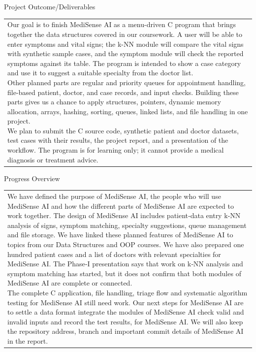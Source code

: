 \documentclass[12pt,a4paper]{article}
\newcommand{\sectiontitle}[1]{%
    {\color{GEUBlue}
    \fontsize{18}{22}\selectfont #1}
}
\newcommand{\answerbox}[2]{%
    \begin{tabularx}{\textwidth}{
        |>{\raggedright\arraybackslash}X|}
        \hline
        \parbox[t][#1][t]{\dimexpr\linewidth-12pt\relax}{
            \vspace{5pt}
            \fontsize{11}{13}\selectfont #2
        }\\
        \hline
    \end{tabularx}
}
\begin{document}
\newpage


\vspace*{0.30cm}

\sectiontitle{Project Outcome/Deliverables }

\vspace{0.05cm}

\vspace{0.35cm}

\answerbox{5.50cm}{Our goal is to finish MediSense AI as a menu-driven C program that brings together the data structures covered in our coursework. A user will be able to enter symptoms and vital signs; the k-NN module will compare the vital signs with synthetic sample cases, and the symptom module will check the reported symptoms against its table. The program is intended to show a case category and use it to suggest a suitable specialty from the doctor list.\\
Other planned parts are regular and priority queues for appointment handling, file-based patient, doctor, and case records, and input checks. Building these parts gives us a chance to apply structures, pointers, dynamic memory allocation, arrays, hashing, sorting, queues, linked lists, and file handling in one project.\\
We plan to submit the C source code, synthetic patient and doctor datasets, test cases with their results, the project report, and a presentation of the workflow. The program is for learning only; it cannot provide a medical diagnosis or treatment advice.}

\vspace{0.75cm}

\sectiontitle{Progress Overview }

\vspace{0.05cm}


\vspace{0.25cm}

\answerbox{5.50cm}{We have defined the purpose of MediSense AI, the people who will use MediSense AI and how the different parts of MediSense AI are expected to work together. The design of MediSense AI includes patient‑data entry k‑NN analysis of signs, symptom matching, specialty suggestions, queue management and file storage. We have linked these planned features of MediSense AI to topics from our Data Structures and OOP courses.
We have also prepared one hundred patient cases and a list of doctors with relevant specialties for MediSense AI. The Phase‑I presentation says that work on k‑NN analysis and symptom matching has started, but it does not confirm that both modules of MediSense AI are complete or connected.\\
The complete C application, file handling, triage flow and systematic algorithm testing for MediSense AI still need work. Our next steps for MediSense AI are to settle a data format integrate the modules of MediSense AI check valid and invalid inputs and record the test results, for MediSense AI. We will also keep the repository address, branch and important commit details of MediSense AI in the report.}
\end{document}
